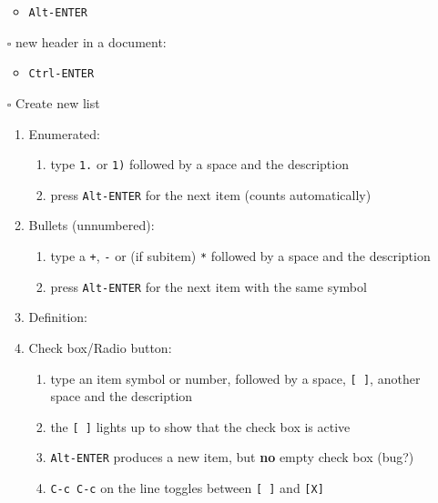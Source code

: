 \documentclass[11pt]{article}
\begin{document}
\begin{itemize}
\begin{itemize}
\item \texttt{Alt-ENTER}
\end{itemize}
\item[{$\square$}] new header in a document:
\begin{itemize}
\item \texttt{Ctrl-ENTER}
\end{itemize}
\item[{$\square$}] Create new list
\begin{enumerate}
\item Enumerated:
\begin{enumerate}
\item type \texttt{1.} or \texttt{1)} followed by a space and the description
\item press \texttt{Alt-ENTER} for the next item (counts automatically)
\end{enumerate}
\item Bullets (unnumbered):
\begin{enumerate}
\item type a \texttt{+}, \texttt{-} or (if subitem) \texttt{*} followed by a space and the description
\item press \texttt{Alt-ENTER} for the next item with the same symbol
\end{enumerate}
\item Definition:
\item Check box/Radio button:
\begin{enumerate}
\item type an item symbol or number, followed by a space, \texttt{[ ]}, another space and the description
\item the \texttt{[ ]} lights up to show that the check box is active
\item \texttt{Alt-ENTER} produces a new item, but \textbf{no} empty check box (bug?)
\item \texttt{C-c C-c} on the line toggles between \texttt{[ ]} and \texttt{[X]}
\end{enumerate}
\end{enumerate}
\end{itemize}
\end{document}
